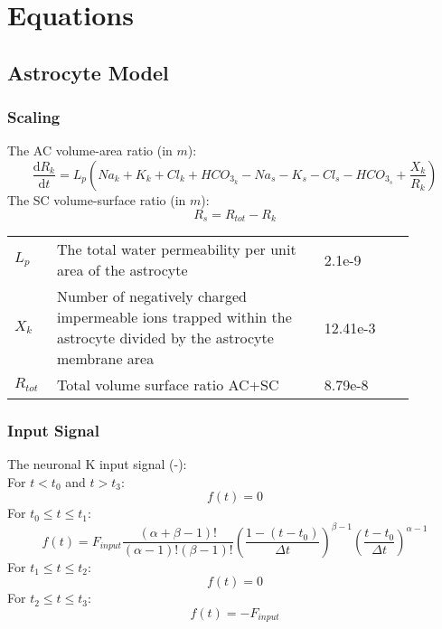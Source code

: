 \section{Equations}

\subsection{Astrocyte Model}

\subsubsection{Scaling}
%
The  \gls{AC}  volume-area ratio (in $m$):
\begin{equation} \label{eq:R_k}
\dfrac{\mathrm{d}R_k}{\mathrm{d}t}= L_p \left( Na_k+K_k+Cl_k+HCO_{3_k}-Na_s-K_s-Cl_s-HCO_{3_{s}}+\frac{X_k}{R_k}\right)
\end{equation}
%
The \gls{SC} volume-surface ratio  (in $m$):
\begin{equation} \label{eq:R_tot}
R_s = R_{tot} - R_k  
\end{equation}
%
\begin{table}[h!]
\centering
\begin{tabular}{| p{0.09\linewidth} | >{\footnotesize} p{0.6\linewidth} | >{\footnotesize} p{0.17\linewidth} | >{\footnotesize} p{0.02\linewidth} |}
\arrayrulecolor{lightgrey}\hline
$L_p$ 			& The total water permeability per unit area of the astrocyte 			& 2.1e-9 \mperuMs &  \cite{Ostby2009}  \\
$X_k$			& Number of negatively charged impermeable ions trapped within the astrocyte divided by the astrocyte membrane area								& 12.41e-3 \uMm & \cite{Ostby2009}  \\
$R_{tot}$ 		& Total volume surface ratio AC+SC   		& 8.79e-8 \m & \cite{Ostby2009}  \\
\hline
\end{tabular}
\end{table}
\newpage
\subsubsection{Input Signal} \label{sec:InputSignal}
%
The neuronal \gls{K} input signal (-):\\
%
For $ t<t_0$ and $t>t_3$:
\begin{equation}
f(t)=0
\end{equation}
%
For $ t_0 \leq t \leq t_1$:
\begin{equation}
f(t)=F_{input} \dfrac{(\alpha+\beta-1)!}{(\alpha-1)!(\beta-1)!} \left( \dfrac{1-(t-t_0)}{\Delta t}\right) ^{\beta -1} \left( \dfrac{t-t_0}{\Delta t}\right) ^{\alpha -1} 
\end{equation}
%
For $ t_1 \leq t \leq t_2$:
\begin{equation}
f(t)=0
\end{equation}
%
For $ t_2 \leq t \leq t_3$:
\begin{equation}
f(t)=-F_{input}
\end{equation}
%
